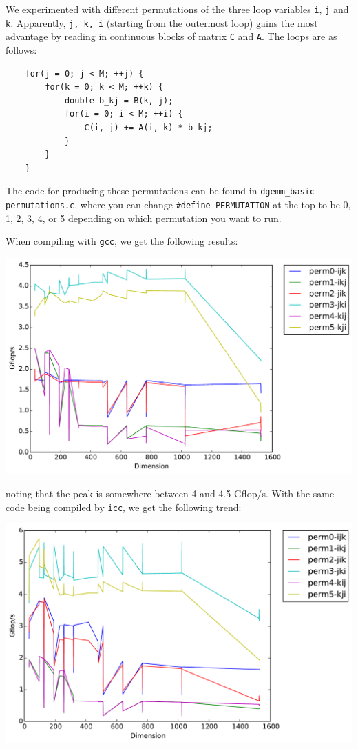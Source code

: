\documentclass[11pt]{article}
\begin{document}
We experimented with different permutations of the three loop variables \texttt{i}, \texttt{j} and \texttt{k}. Apparently, \texttt{j, k, i} (starting from the outermost loop) gains the most advantage by reading in continuous blocks of matrix \texttt{C} and \texttt{A}. The loops are as follows:

\begin{lstlisting}
    for(j = 0; j < M; ++j) {
        for(k = 0; k < M; ++k) {
            double b_kj = B(k, j);
            for(i = 0; i < M; ++i) {
                C(i, j) += A(i, k) * b_kj;
            }
        }
    }
\end{lstlisting}

\noindent The code for producing these permutations can be found in \texttt{dgemm\_basic-permutations.c}, where you can change \texttt{\#define PERMUTATION} at the top to be 0, 1, 2, 3, 4, or 5 depending on which permutation you want to run.

\noindent When compiling with \texttt{gcc}, we get the following results:

\begin{center}
    \includegraphics[scale=0.5]{benchmarking/permutations/gcc/timing.pdf}
\end{center}

\noindent noting that the peak is somewhere between 4 and 4.5 Gflop/s.  With the same code being compiled by \texttt{icc}, we get the following trend:

\begin{center}
    \includegraphics[scale=0.5]{benchmarking/permutations/icc/timing.pdf}
\end{center}
\end{document}
